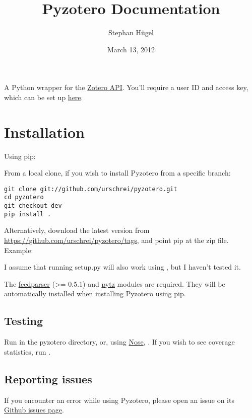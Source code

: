 \documentclass[letterpaper,10pt,english]{sphinxmanual}
\title{Pyzotero Documentation}
\date{March 13, 2012}
\author{Stephan Hügel}
\begin{document}
\maketitle
\tableofcontents
{}\label{index::doc}


A Python wrapper for the \href{http://www.zotero.org/support/dev/server\_api}{Zotero API}. You'll require a user ID and access key, which can be set up \href{http://www.zotero.org/settings/keys/new}{here}.
\label{index:module-pyzotero.zotero}

\chapter{Installation}
\label{index:installation}\label{index:description}
Using pip: 

From a local clone, if you wish to install Pyzotero from a specific branch:

\begin{Verbatim}[commandchars=\\\{\}]
git clone git://github.com/urschrei/pyzotero.git
cd pyzotero
git checkout dev
pip install .
\end{Verbatim}

Alternatively, download the latest version from \href{https://github.com/urschrei/pyzotero/tags}{https://github.com/urschrei/pyzotero/tags}, and point pip at the zip file.
Example: 

I assume that running setup.py will also work using , but I haven't tested it.

The \href{http://feedparser.org}{feedparser} (\textgreater{}= 0.5.1) and \href{http://pypi.python.org/pypi/pytz/}{pytz} modules are required. They will be automatically installed when installing Pyzotero using pip.


\section{Testing}
\label{index:testing}
Run  in the pyzotero directory, or, using \href{http://somethingaboutorange.com/mrl/projects/nose/1.0.0/index.html}{Nose}, . If you wish to see coverage statistics, run .


\section{Reporting issues}
\label{index:reporting-issues}
If you encounter an error while using Pyzotero, please open an issue on its \href{https://github.com/urschrei/pyzotero/issues}{Github issues page}.
\end{document}
